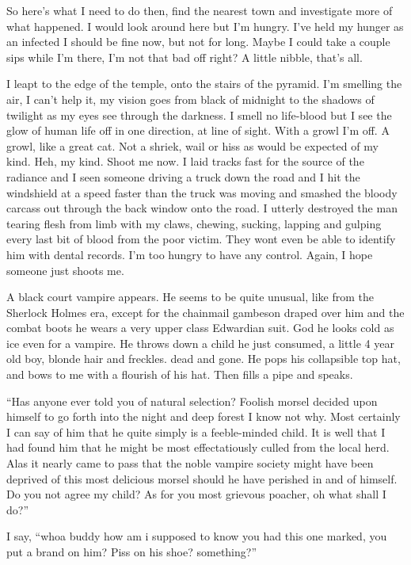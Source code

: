 So here's what I need to do then, find the nearest town and investigate more of what happened. I would look around here but I'm hungry. I've held my hunger as an infected I should be fine now, but not for long. Maybe I could take a couple sips while I'm there, I'm not that bad off right? A little nibble, that's all.

I leapt to the edge of the temple, onto the stairs of the pyramid. I'm smelling the air, I can't help it, my vision goes from black of midnight to the shadows of twilight as my eyes see through the darkness. I smell no life-blood but I see the glow of human life off in one direction, at line of sight. With a growl I'm off. A growl, like a great cat. Not a shriek, wail or hiss as would be expected of my kind. Heh, my kind. Shoot me now. I laid tracks fast for the source of the radiance and I seen someone driving a truck down the road and I hit the windshield at a speed faster than the truck was moving and smashed the bloody carcass out through the back window onto the road. I utterly destroyed the man tearing flesh from limb with my claws, chewing, sucking, lapping and gulping every last bit of blood from the poor victim. They wont even be able to identify him with dental records. I'm too hungry to have any control. Again, I hope someone just shoots me.

A black court vampire appears. He seems to be quite unusual, like from the Sherlock Holmes era, except for the chainmail gambeson draped over him and the combat boots he wears a very upper class Edwardian suit. God he looks cold as ice even for a vampire. He throws down a child he just consumed, a little 4 year old boy, blonde hair and freckles. dead and gone. He pops his collapsible top hat, and bows to me with a flourish of his hat. Then fills a pipe and speaks.

``Has anyone ever told you of natural selection? Foolish morsel decided upon himself to go forth into the night and deep forest I know not why. Most certainly I can say of him that he quite simply is a feeble-minded child. It is well that I had found him that he might be most effectatiously culled from the local herd. Alas it nearly came to pass that the noble vampire society might have been deprived of this most delicious morsel should he have perished in and of himself. Do you not agree my child? As for you most grievous poacher, oh what shall I do?''



I say, ``whoa buddy how am i supposed to know you had this one marked, you put a brand on him? Piss on his shoe? something?''


